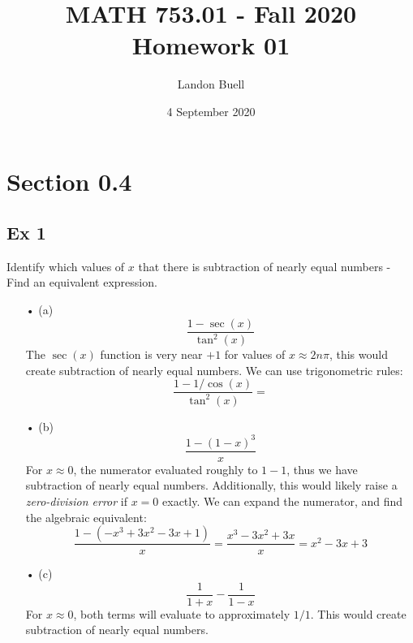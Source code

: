 \documentclass[12pt,letterpaper]{article}
\begin{document}

\title{MATH 753.01 - Fall 2020 \\ Homework 01}
\author{Landon Buell}
\date{4 September 2020}
\maketitle


\section*{Section 0.4}


\subsection*{Ex 1}
Identify which values of $x$ that there is subtraction of nearly equal numbers - Find an equivalent expression.

\begin{itemize}

\item[•] (a)
\begin{equation}
\frac{1 - \sec(x)}{\tan^2(x)} 
\end{equation}
The $\sec(x)$ function is very near $+1$ for values of $x \approx 2n\pi$, this would create subtraction of nearly equal numbers. We can use trigonometric rules:
\begin{equation}
\frac{1 - 1/\cos(x)}{\tan^2(x)} = 
\end{equation}

\item[•] (b)
\begin{equation}
\frac{1 - (1 - x)^3}{x}
\end{equation}
For $x \approx 0$, the numerator evaluated roughly to $1 - 1$, thus we have subtraction of nearly equal numbers. Additionally, this would likely raise a \textit{zero-division error} if $x = 0$ exactly. We can expand the numerator, and find the algebraic equivalent:
\begin{equation}
\frac{1 - (-x^3 + 3x^2 - 3x + 1)}{x} = \frac{x^3 - 3x^2 + 3x}{x} = x^2 - 3x + 3
\end{equation}

\item[•] (c)
\begin{equation}
\frac{1}{1 + x} - \frac{1}{1 - x}
\end{equation}
For $x \approx 0$, both terms will evaluate to approximately $1/1$. This would create subtraction of nearly equal numbers. 

\end{itemize}
\end{document}
